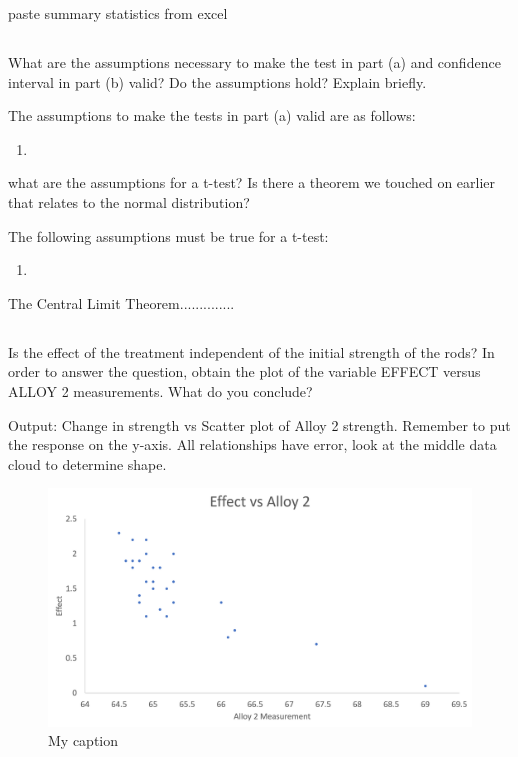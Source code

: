 \documentclass[letterpaper]{article}
\begin{document}
paste summary statistics from excel

\subsection{}%
What are the  assumptions necessary to make the test in part (a) and confidence
interval in part (b)  valid?  Do the assumptions hold?  Explain briefly.

The assumptions to make the tests in part (a) valid are as follows:

\begin{enumerate}
 \item
\end{enumerate}

what are the assumptions for a t-test? Is there a theorem we touched on earlier
that relates to the normal distribution?

The following assumptions must be true for a t-test:
\begin{enumerate}
 \item
\end{enumerate}
The Central Limit Theorem..............

\subsection{}%
Is the effect of the treatment independent of the initial strength of the rods?
In order to answer the  question, obtain the plot of the variable EFFECT versus
ALLOY 2 measurements. What do you  conclude?

Output: Change in strength vs Scatter plot of Alloy 2 strength.
Remember to put the response on the y-axis. All relationships have
error, look at the middle data cloud to determine shape.

\begin{figure}[H]
 \centering
 \includegraphics[width=\textwidth]{q6.png}
 \caption{My caption}
 \label{q6}
\end{figure}
\end{document}
